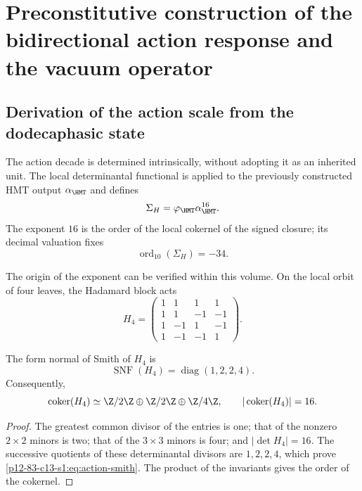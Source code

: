 \label{chap:83-13}

\section{Preconstitutive construction of the bidirectional action response and the vacuum operator}
\label{p12-83-c13-s1:ch:vacuum}

\subsection{Derivation of the action scale from the dodecaphasic state}

The action decade is determined intrinsically, without adopting it as an
inherited unit. The local determinantal functional is applied to the previously
constructed HMT output \(\alpha_{\HMT}\) and defines
\begin{equation}
\Sigma_H=\varphi_{\HMT}\alpha_{\HMT}^{16}.
\label{p12-83-c13-s1:eq:action-determinantal-reader}
\end{equation}
The exponent \(16\) is the order of the local cokernel of the signed closure; its decimal valuation fixes
\begin{equation}
\operatorname{ord}_{10}(\Sigma_H)=-34.
\label{p12-83-c13-s1:eq:action-decade}
\end{equation}

The origin of the exponent can be verified within this volume. On the
local orbit of four leaves, the Hadamard block acts
\begin{equation}
H_4=
\begin{pmatrix}
1&1&1&1\\
1&1&-1&-1\\
1&-1&1&-1\\
1&-1&-1&1
\end{pmatrix}.
\label{p12-83-c13-s1:eq:action-hadamard}
\end{equation}

\begin{lemma}
The form normal of Smith of \(H_4\) is
\begin{equation}
\operatorname{SNF}(H_4)=\operatorname{diag}(1,2,2,4).
\label{p12-83-c13-s1:eq:action-smith}
\end{equation}
Consequently,
\[
\operatorname{coker}(H_4)\simeq
\Z/2\Z\oplus\Z/2\Z\oplus\Z/4\Z,
\qquad
|\operatorname{coker}(H_4)|=16.
\]
\end{lemma}

\begin{proof}
The greatest common divisor of the entries is one; that of the nonzero
\(2\times2\) minors is two; that of the \(3\times3\) minors is four; and
\(|\det H_4|=16\). The successive quotients of these determinantal divisors
are \(1,2,2,4\), which prove \cref{p12-83-c13-s1:eq:action-smith}. The product of the
invariants gives the order of the cokernel.
\end{proof}

